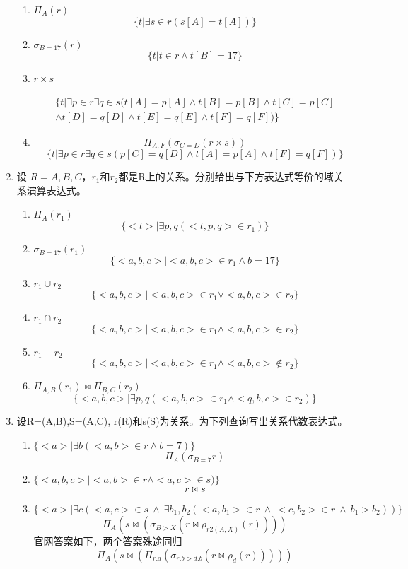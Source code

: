 \documentclass{dingjia}
\begin{document}
\begin{enumerate}
  \begin{enumerate}
  \item $ \Pi_A(r) $
    \[ \{ t | \exists s \in r(s[A] = t[A]) \}\]

  \item $ \sigma_{B=17}(r) $
    \[ \{ t | t \in r \land t[B] = 17 \}\]

  \item $ r \times s $

    \begin{gather*}
      \{ t | \exists p \in r \exists q \in s(t[A]=p[A] \land t[B]=p[B] \land
      t[C]=p[C] \\
      \land t[D]=q[D] \land t[E]=q[E] \land t[F]=q[F]) \}
    \end{gather*}

  \item \[ \Pi_{A,F}(\sigma_{C=D}(r \times s)) \]
    \[ \{ t |  \exists p \in r \exists q \in s(p[C] = q[D] \land t[A] = p[A] \land t[F]
      = q[F]) \}\]
  \end{enumerate}

\item 设 $R=A,B,C$，$r_1$和$r_2$都是R上的关系。分别给出与下方表达式等价的域关
  系演算表达式。
  \begin{enumerate}
  \item $\Pi_A(r_1)$
    \[ \{ <t> | \exists p, q (<t,p,q> \in r_1)\}\]

  \item $ \sigma_{B=17}(r_1)$
    \[ \{ <a,b,c> |<a,b,c> \in r_1 \land b = 17\}\]

  \item $ r_1 \cup r_2$
    \[ \{ <a,b,c> |<a,b,c> \in r_1 \lor <a,b,c> \in r_2\}\]

  \item $ r_1 \cap r_2$
    \[ \{ <a,b,c> |<a,b,c> \in r_1 \land<a,b,c> \in r_2\}\]

  \item $ r_1 - r_2$
    \[ \{ <a,b,c> |<a,b,c> \in r_1 \land <a,b,c> \not \in r_2\}\]

  \item $ \Pi_{A,B}(r_1) \bowtie \Pi_{B,C}(r_2)$
    \[\{ <a,b,c> | \exists p,q(<a,b,c> \in r_1 \land <q,b,c> \in r_2)\}\]

  \end{enumerate}

\item 设R=(A,B),S=(A,C), r(R)和s(S)为关系。为下列查询写出关系代数表达式。
  \begin{enumerate}
  \item $ \{<a>| \exists b(<a,b> \in r \land b=7)\}$
    \[ \Pi_A(\sigma_{B=7}r)\]
  \item $ \{<a,b,c>| <a,b> \in r \land <a,c> \in s)\}$
    \[ r \bowtie s\]
  \item $ \{<a>| \exists c(<a,c> \in s\  \land \ \exists b_1,b_2(<a,b_1> \in r
    \ \land\  <c,b_2> \in r \ \land\  b_1 > b_2)) \}$
    \[ \Pi_{A}(s \bowtie (\sigma_{B >X}(r \bowtie \rho_{r2(A,X)}(r)))) \]
    官网答案如下，两个答案殊途同归
    \[ \Pi_{A}(s \bowtie (\Pi_{r.a}(\sigma_{r.b >d.b}(r \bowtie \rho_{d}(r)))))\]
  \end{enumerate}



\end{enumerate}
\end{document}
